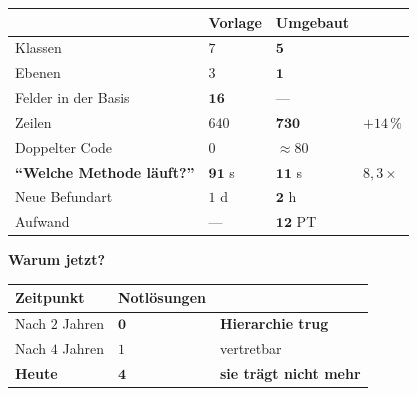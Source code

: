 \begin{merksatz}
\begin{center}
{\small
\renewcommand{\arraystretch}{1.45}
\begin{tabular}{@{}P{2.8cm}P{2.0cm}P{2.2cm}P{2.0cm}@{}}
\toprule
& \textbf{Vorlage} & \textbf{Umgebaut} & \\
\midrule
Klassen & $7$ & $\mathbf{5}$ & \\
Ebenen & $3$ & $\mathbf{1}$ & \\
Felder in der Basis & $\mathbf{16}$ & --- & \\
Zeilen & $640$ & $\mathbf{730}$ & $+14\,\%$\\
Doppelter Code & $0$ & \textcolor{akzent}{$\approx80$} & \\
\textbf{\enquote{Welche Methode läuft?}} & $\mathbf{91}$ s & $\mathbf{11}$ s & $8{,}3\times$\\
Neue Befundart & $1$ d & $\mathbf{2}$ h & \\
Aufwand & --- & $\mathbf{12}$ PT & \\
\bottomrule
\end{tabular}}
\end{center}

\begin{center}
\begin{minipage}{0.88\textwidth}
\end{minipage}
\end{center}

\textbf{Warum jetzt?}

\begin{center}
\renewcommand{\arraystretch}{1.45}
\begin{tabular}{@{}P{3.0cm}P{2.4cm}P{2.4cm}@{}}
\toprule
\textbf{Zeitpunkt} & \textbf{Notlösungen} & \\
\midrule
Nach $2$ Jahren & $\mathbf{0}$ & \textcolor{gruen}{\textbf{Hierarchie trug}}\\
Nach $4$ Jahren & $1$ & \textcolor{mittel}{vertretbar}\\
\textbf{Heute} & $\mathbf{4}$ & \textcolor{akzent}{\textbf{sie trägt nicht mehr}}\\
\bottomrule
\end{tabular}
\end{center}

\begin{center}
\end{center}
\end{merksatz}

